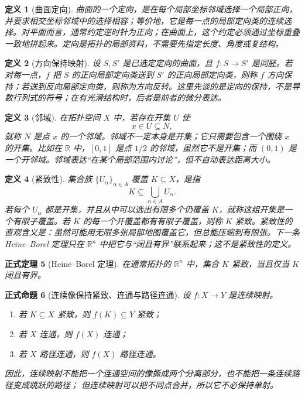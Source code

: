 \documentclass[UTF8,fontset=none,a4paper,11pt]{ctexart}
\theoremstyle{foundation-definition}
\newtheorem{definition}{定义}[section]
\theoremstyle{foundation-theorem}
\newtheorem{theorem}[definition]{正式定理}
\theoremstyle{foundation-proposition}
\newtheorem{proposition}[definition]{正式命题}
\theoremstyle{foundation-example}
\theoremstyle{foundation-remark}
\theoremstyle{foundation-theorem}
\begin{document}
\begin{definition}[曲面定向]\label{def:surface-orientation}
曲面的一个定向，是在每个局部坐标邻域选择一个局部正向，并要求相交坐标邻域中的选择相容；等价地，它是每一点的局部定向类的连续选择。对平面而言，通常约定逆时针为正向；在曲面上，这个约定必须通过坐标重叠一致地拼起来。定向是拓扑的局部资料，不需要先指定长度、角度或复结构。
\end{definition}

\begin{definition}[方向保持映射]\label{def:orientation-preserving}
设 \(S,S'\) 是已选定定向的曲面，且 \(f:S\to S'\) 是同胚。若对每一点，\(f\) 把 \(S\) 的正向局部定向类送到 \(S'\) 的正向局部定向类，则称 \(f\) 方向保持；若送到反向局部定向类，则称为方向反转。这里先谈的是定向的保持，不是导数行列式的符号；在有光滑结构时，后者是前者的微分表达。
\end{definition}

\begin{definition}[邻域]\label{def:neighborhood}
在拓扑空间 \(X\) 中，若存在开集 \(U\) 使
\[
x\in U\subseteq N,
\]
就称 \(N\) 是点 \(x\) 的一个邻域。邻域不一定本身是开集；它只需要包含一个围绕 \(x\) 的开集。比如在 \(\mathbb R\) 中，\([0,1]\) 是点 \(1/2\) 的邻域，虽然它不是开集；而 \((0,1)\) 是一个开邻域。邻域表达“在某个局部范围内讨论”，但不自动表达距离大小。
\end{definition}

\begin{definition}[紧致性]\label{def:compact}
集合族 \(\{U_\alpha\}_{\alpha\in A}\) 覆盖 \(K\subseteq X\)，是指
\[
K\subseteq\bigcup_{\alpha\in A}U_\alpha.
\]
若每个 \(U_\alpha\) 都是开集，并且从中可以选出有限多个仍覆盖 \(K\)，就称这组开集是一个有限子覆盖。若 \(K\) 的每一个开覆盖都有有限子覆盖，则称 \(K\) 紧致。紧致性的直观含义是：虽然可能用无限多张局部地图覆盖它，但总能压缩到有限张。下一条 Heine--Borel 定理只在 \(\mathbb R^n\) 中把它与“闭且有界”联系起来；这不是紧致性的定义。
\end{definition}

\begin{theorem}[Heine--Borel 定理]
在通常拓扑的 \(\mathbb R^n\) 中，集合 \(K\) 紧致，当且仅当 \(K\) 闭且有界。
\end{theorem}

\begin{proposition}[连续像保持紧致、连通与路径连通]\label{prop:continuous-image-compact-connected}
设 \(f:X\to Y\) 是连续映射。
\begin{enumerate}[label=(\alph*)]
  \item 若 \(K\subseteq X\) 紧致，则 \(f(K)\subseteq Y\) 紧致；
  \item 若 \(X\) 连通，则 \(f(X)\) 连通；
  \item 若 \(X\) 路径连通，则 \(f(X)\) 路径连通。
\end{enumerate}
因此，连续映射不能把一个连通空间的像撕成两个分离部分，也不能把一条连续路径变成跳跃的路径；
但连续映射可以把不同点合并，所以它不必保持单射。
\end{proposition}
\end{document}
